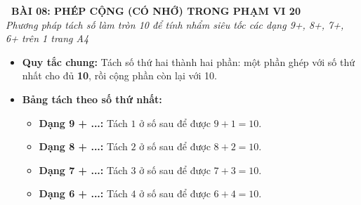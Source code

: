 \documentclass[11pt,a4paper]{article}
\begin{document}
\begin{tcolorbox}[
  enhanced,
  colback=violet!8!white,
  colframe=violet!70!black,
  arc=3mm, boxrule=1.2pt,
  left=3mm, right=3mm, top=2mm, bottom=2mm,
  halign=center
]
  {\LARGE\bfseries\color{violet!90!black}\faBookmark\ BÀI 08: PHÉP CỘNG (CÓ NHỚ) TRONG PHẠM VI 20}\\[1mm]
  {\itshape\footnotesize\color{black!75} Phương pháp tách số làm tròn 10 để tính nhẩm siêu tốc các dạng 9+, 8+, 7+, 6+ trên 1 trang A4}
\end{tcolorbox}

\vspace{-2mm}

\noindent
\begin{minipage}[t]{0.49\textwidth}\vspace{0pt}
\begin{tcolorbox}[
  enhanced,
  colback=violet!4!white,
  colframe=violet!75!black,
  arc=2mm, boxrule=0.8pt,
  left=2mm, right=2mm, top=1.8mm, bottom=1.8mm,
  title={\footnotesize\bfseries\color{white}\faKey\ 1. Phương pháp làm cho tròn 10}
]
{\footnotesize
\begin{itemize}\setlength{\itemsep}{1pt}\setlength{\leftskip}{-2.5mm}
  \item \textbf{Quy tắc chung:} Tách số thứ hai thành hai phần: một phần ghép với số thứ nhất cho đủ \textbf{10}, rồi cộng phần còn lại với 10.
  \item \textbf{Bảng tách theo số thứ nhất:}
  \begin{itemize}\setlength{\itemsep}{0.5pt}\setlength{\leftskip}{-2.5mm}
    \item \textbf{Dạng 9 + ...:} Tách $1$ ở số sau để được $9 + 1 = 10$.
    \item \textbf{Dạng 8 + ...:} Tách $2$ ở số sau để được $8 + 2 = 10$.
    \item \textbf{Dạng 7 + ...:} Tách $3$ ở số sau để được $7 + 3 = 10$.
    \item \textbf{Dạng 6 + ...:} Tách $4$ ở số sau để được $6 + 4 = 10$.
  \end{itemize}
\end{itemize}
}
\end{tcolorbox}
\end{minipage}
\hfill
\end{document}
